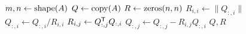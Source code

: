 \begin{algorithm}[H]
\begin{algorithmic}[1]
    \State $m, n \gets \mathrm{shape}(A)$
    \State $Q \gets \mathrm{copy}(A)$
    \State $R \gets \zeros{n}{n}$
        \State $R_{i,i} \gets \|Q_{:,i}\|$\label{step:mgs-normalize}
        \State $Q_{:,i} \gets Q_{:,i}/R_{i,i}$\label{step:mgs-mult1}
            \State $R_{i,j} \gets Q_{:,j}^{\mathsf T}  Q_{:,i}$\label{step:mgs-mult2}
            \State $Q_{:,j} \gets Q_{:,j}-R_{i,j}Q_{:,i}$\label{step:mgs-mult3}
        \EndFor
    \EndFor
    \State {} $Q, R$
\EndProcedure
\end{algorithmic}
\caption{}
\label{Alg:modified-Gram-Schmidt}
\end{algorithm}

